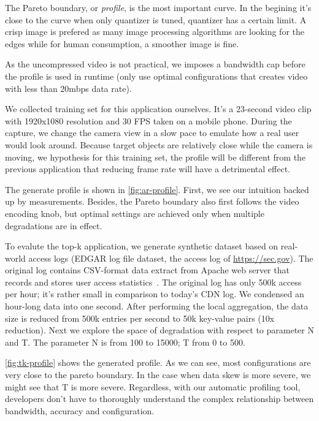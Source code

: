 The Pareto boundary, or \textit{profile}, is the most important curve. In the
begining it's close to the curve when only quantizer is tuned, quantizer has a
certain limit. A crisp image is prefered as many image processing algorithms are
looking for the edges while for human consumption, a smoother image is fine.

As the uncompressed video is not practical, we imposes a bandwidth cap before
the profile is used in runtime (only use optimal configurations that creates
video with less than 20mbps data rate).

 We collected training set for this application
ourselves. It's a 23-second video clip with 1920x1080 resolution and 30 FPS
taken on a mobile phone. During the capture, we change the camera view in a slow
pace to emulate how a real user would look around. Because target objects are
relatively close while the camera is moving, we hypothesis for this training
set, the profile will be different from the previous application that reducing
frame rate will have a detrimental effect.

The generate profile is shown in \autoref{fig:ar-profile}. First, we see our
intuition backed up by measurements. Besides, the Pareto boundary also first
follows the video encoding knob, but optimal settings are achieved only when
multiple degradations are in effect.

 To evalute the top-k application, we generate synthetic dataset
based on real-world access logs (EDGAR log file dataset, the access log of
\url{https://sec.gov}). The original log contains CSV-format data extract from
Apache web server that records and stores user access
statistics~\cite{edgarlog}. The original log has only 500k access per hour; it's
rather small in comparison to today's CDN log. We condensed an hour-long data
into one second. After performing the local aggregation, the data size is
reduced from 500k entries per second to 50k key-value pairs (10x reduction).
Next we explore the space of degradation with respect to parameter N and T.  The
parameter N is from 100 to 15000; T from 0 to 500.

\autoref{fig:tk-profile} shows the generated profile. As we can see, most
configurations are very close to the pareto boundary. In the case when data skew
is more severe, we might see that T is more severe. Regardless, with our
automatic profiling tool, developers don't have to thoroughly understand the
complex relationship between bandwidth, accuracy and configuration.

